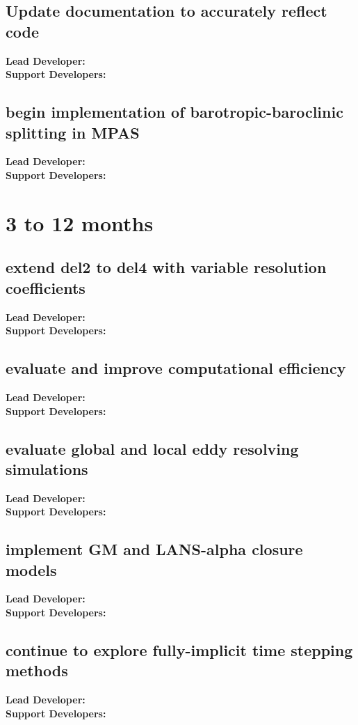 \subsection{Update documentation to accurately reflect code}
{\bf Lead Developer:  } \\
{\bf Support Developers: } \\
\subsection{begin implementation of barotropic-baroclinic splitting in MPAS}
{\bf Lead Developer:  } \\
{\bf Support Developers: } \\


\section{3 to 12 months}
\subsection{extend del2 to del4 with variable resolution coefficients}
{\bf Lead Developer:  } \\
{\bf Support Developers: } \\
\subsection{evaluate and improve computational efficiency}
{\bf Lead Developer:  } \\
{\bf Support Developers: } \\
\subsection{evaluate global and local eddy resolving simulations}
{\bf Lead Developer:  } \\
{\bf Support Developers: } \\
\subsection{implement GM and LANS-alpha closure models}
{\bf Lead Developer:  } \\
{\bf Support Developers: } \\
\subsection{continue to explore fully-implicit time stepping methods}
{\bf Lead Developer:  } \\
{\bf Support Developers: } \\
